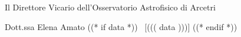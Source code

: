 \begin{flushright}
\begin{minipage}[c]{12cm}
\begin{center}
Il Direttore Vicario dell'Osservatorio Astrofisico di Arcetri

Dott.ssa Elena Amato  ((* if data *)) ~[((( data )))] ((* endif *))
\end{center}
\end{minipage}
\end{flushright}


